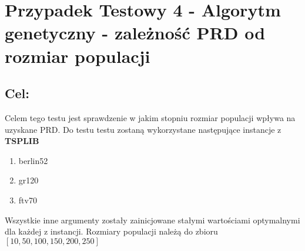 \section{Przypadek Testowy 4 - Algorytm genetyczny - zależność PRD od rozmiar populacji}
  \subsection{Cel:}
    Celem tego testu jest sprawdzenie w jakim stopniu rozmiar populacji wpływa na uzyskane PRD. 
    Do testu testu zostaną wykorzystane następujące instancje z \textbf{TSPLIB}
    \begin{enumerate}
        \item berlin52
        \item gr120
        \item ftv70
    \end{enumerate}
    Wszystkie inne argumenty zostały zainicjowane stałymi wartościami optymalnymi dla każdej z instancji. Rozmiary populacji należą do zbioru $ [10,50,100,150,200,250] $
